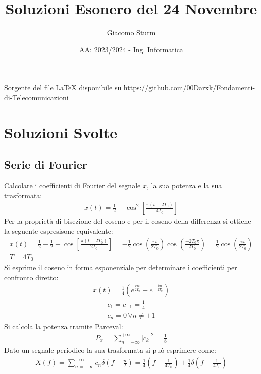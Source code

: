 \documentclass{article}
\title{Soluzioni Esonero del 24 Novembre}
\author{Giacomo Sturm}
\date{AA: 2023/2024 - Ing. Informatica}
\begin{document}
\maketitle

\vspace{10mm}

\begin{center}
    Sorgente del file LaTeX disponibile su \url{https://github.com/00Darxk/Fondamenti-di-Telecomunicazioni}
\end{center}

\clearpage

\tableofcontents

\clearpage

\section{Soluzioni Svolte}

\subsection{Serie di Fourier}
Calcolare i coefficienti di Fourier del segnale $x$, la sua potenza e la sua trasformata:
\begin{gather*}
    x(t)=\displaystyle\frac{1}{2}-\cos^2\left[\frac{\pi(t-2T_0)}{4T_0}\right]
\end{gather*}
Per la proprietà di bisezione del coseno e per il coseno della differenza si ottiene la seguente espresisone equivalente:
\begin{gather*}
    x(t)=\displaystyle\frac{1}{2}-\frac{1}{2}-\cos\left[\frac{\pi(t-2T_0)}{2T_0}\right]=-\frac{1}{2}\cos\left(\frac{\pi t}{2T_0}\right)\cos\left(\frac{-2T_0\pi}{2T_0}\right)=\frac{1}{2}\cos\left(\frac{\pi t}{2T_0}\right)\\
    T=4T_0
\end{gather*}
Si esprime il coseno in forma esponenziale per determinare i coefficienti per confronto diretto:
\begin{gather*}
    x(t)=\displaystyle\frac{1}{4}\left(e^{\frac{i\pi t}{2T_0}}-e^{-\frac{i\pi t}{2T_0}}\right)
\end{gather*}
\begin{gather}
    c_1=c_{-1}=\displaystyle\frac{1}{4}\\
    c_n=0\,\forall n\neq\pm1
\end{gather}
Si calcola la potenza tramite Parceval:
\begin{gather}
    P_x=\displaystyle\sum_{n=-\infty}^{+\infty}|c_k|^2=\frac{1}{8}
\end{gather}
Dato un segnale periodico la sua trasformata si può esprimere come:
\begin{gather}
    X(f)=\displaystyle\sum_{n=-\infty}^{+\infty}c_n\delta\left(f-\frac{n}{T}\right)=\frac{1}{4}\left(f-\frac{1}{4T_0}\right)+\frac{1}{4}\delta\left(f+\frac{1}{4T_0}\right)
\end{gather}
\end{document}
